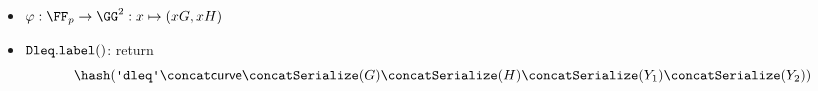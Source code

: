 \documentclass[11pt]{article}
\begin{document}
\begin{itemize}
  \item $\varphi:\FF_p\to\GG^2:x\mapsto (xG,xH)$
  \item $\texttt{Dleq}.\texttt{label}()$: return
  \[
    \hash(\dleqlabel \concat \curvectx \concat \serialize(G) \concat \serialize(H) \concat \serialize(\statement_1) \concat \serialize(\statement_2))
  \]
\end{itemize}
\end{document}
